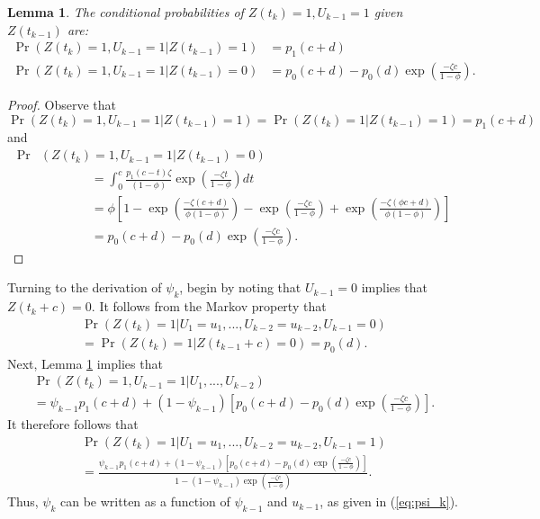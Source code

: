 \documentclass[man, noextraspace, floatsintext]{apa6}\usepackage[]{graphicx}\usepackage[]{color}
\newtheorem{lemma}{Lemma}
\begin{document}
\begin{lemma}
\label{lemma1}
The conditional probabilities of $Z(t_k) = 1, U_{k-1} = 1$ given $Z(t_{k-1})$ are:
\begin{align*}
\Pr\left(Z(t_k) = 1, U_{k-1} = 1 \left| Z(t_{k-1}) = 1 \right.\right) &= p_1(c + d) \\
\Pr\left(Z(t_k) = 1, U_{k-1} = 1 \left| Z(t_{k-1}) = 0 \right.\right) &= p_0(c + d) - p_0(d) \exp\left(\frac{- \zeta c}{1 - \phi}\right).
\end{align*}
\end{lemma}

\begin{proof}
Observe that \[
\Pr\left(Z(t_k) = 1, U_{k-1} = 1 \left| Z(t_{k-1}) = 1 \right.\right) = \Pr\left(Z(t_k) = 1 \left| Z(t_{k-1}) = 1 \right.\right) = p_1(c + d) \]
and \begin{align*}
\Pr &\left(Z(t_k) = 1, U_{k-1} = 1 \left| Z(t_{k-1}) = 0 \right.\right) \\
& \qquad \qquad = \int_0^c\frac{p_1(c - t) \zeta}{(1 - \phi)}\exp\left(\frac{-\zeta t}{1 - \phi}\right) dt \\
& \qquad \qquad  = \phi \left[ 1 - \exp\left(\frac{- \zeta (c + d)}{\phi(1 - \phi)}\right) - \exp\left(\frac{- \zeta c}{1 - \phi}\right) + \exp\left(\frac{- \zeta (\phi c + d)}{\phi(1 - \phi)}\right)\right] \\
& \qquad \qquad = p_0(c + d) - p_0(d) \exp\left(\frac{- \zeta c}{1 - \phi}\right).
\end{align*}
\end{proof}

Turning to the derivation of $\psi_k$, begin by noting that $U_{k-1} = 0$ implies that $Z(t_k + c) = 0$. 
It follows from the Markov property that 
\begin{multline*}
\Pr\left(Z(t_k) = 1 \left| U_1 = u_1,...,U_{k-2} = u_{k-2}, U_{k-1} = 0 \right.\right) \\ 
= \Pr\left(Z(t_k) = 1 \left| Z(t_{k-1} + c) = 0 \right.\right) = p_0(d).
\end{multline*}
Next, Lemma \ref{lemma1} implies that \begin{multline*}
\Pr\left(Z(t_k) = 1, U_{k-1} = 1 \left| U_1,...,U_{k-2} \right.\right) \\
= \psi_{k-1} p_1(c + d) + (1 - \psi_{k-1}) \left[p_0(c + d) - p_0(d) \exp\left(\frac{- \zeta c}{1 - \phi}\right)\right].
\end{multline*}
It therefore follows that 
\begin{multline*}
\Pr\left(Z(t_k) = 1 \left| U_1 = u_1,...,U_{k-2} = u_{k-2}, U_{k-1} = 1 \right.\right) \\
= \frac{\psi_{k-1} p_1(c + d) + (1 - \psi_{k-1}) \left[p_0(c + d) - p_0(d) \exp\left(\frac{- \zeta c}{1 - \phi}\right)\right]}{1 - (1 - \psi_{k-1})\exp\left( \frac{-\zeta c}{1 - \phi}\right)}.
\end{multline*}
Thus, $\psi_k$ can be written as a function of $\psi_{k-1}$ and $u_{k-1}$, as given in (\ref{eq:psi_k}).
\end{document}
